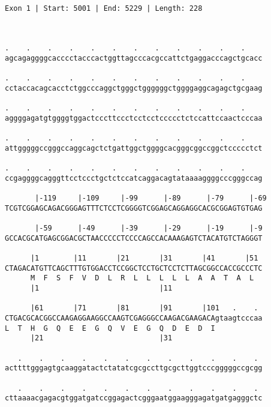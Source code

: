 \documentclass{article}
\begin{document}
 \begin{Verbatim}
 
Exon 1 | Start: 5001 | End: 5229 | Length: 228



.    .    .    .    .    .    .    .    .    .    .    .    
agcagaggggcacccctacccactggttagcccacgccattctgaggacccagctgcacc
                                                            
.    .    .    .    .    .    .    .    .    .    .    .    
cctaccacagcacctctggcccaggctgggctggggggctggggaggcagagctgcgaag
                                                            
.    .    .    .    .    .    .    .    .    .    .    .    
aggggagatgtggggtggactcccttccctcctcctccccctctccattccaactcccaa
                                                            
.    .    .    .    .    .    .    .    .    .    .    .    
attgggggccgggccaggcagctctgattggctggggcacgggcggccggctccccctct
                                                            
.    .    .    .    .    .    .    .    .    .    .    .    
ccgaggggcagggttcctccctgctctccatcaggacagtataaaaggggcccgggccag
                                                            
       |-119     |-109     |-99      |-89      |-79      |-69
TCGTCGGAGCAGACGGGAGTTTCTCCTCGGGGTCGGAGCAGGAGGCACGCGGAGTGTGAG
                                                            
       |-59      |-49      |-39      |-29      |-19      |-9
GCCACGCATGAGCGGACGCTAACCCCCTCCCCAGCCACAAAGAGTCTACATGTCTAGGGT
                                                            
      |1        |11       |21       |31       |41       |51 
CTAGACATGTTCAGCTTTGTGGACCTCCGGCTCCTGCTCCTCTTAGCGGCCACCGCCCTC
      M  F  S  F  V  D  L  R  L  L  L  L  L  A  A  T  A  L  
      |1                            |11                     
  
      |61       |71       |81       |91       |101   .    . 
CTGACGCACGGCCAAGAGGAAGGCCAAGTCGAGGGCCAAGACGAAGACAgtaagtcccaa
L  T  H  G  Q  E  E  G  Q  V  E  G  Q  D  E  D  I           
      |21                           |31                     
  
   .    .    .    .    .    .    .    .    .    .    .    . 
acttttgggagtgcaaggatactctatatcgcgccttgcgcttggtcccgggggccgcgg
                                                            
   .    .    .    .    .    .    .    .    .    .    .    . 
cttaaaacgagacgtggatgatccggagactcgggaatggaagggagatgatgagggctc
                                                            

\end{Verbatim}
\end{document}
